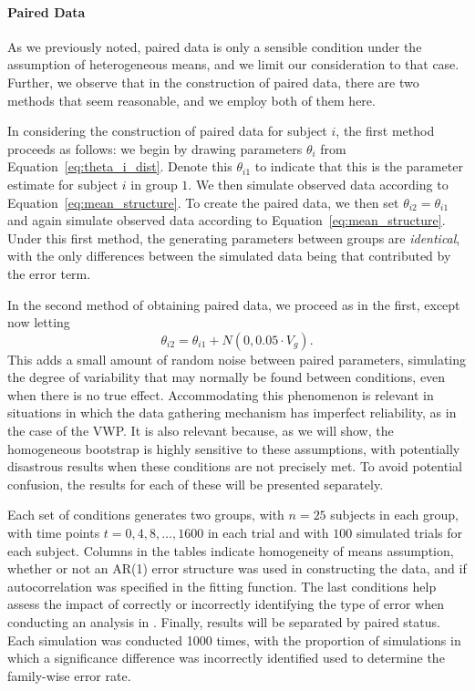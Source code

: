 \paragraph{Paired Data} As we previously noted, paired data is only a sensible condition under the assumption of heterogeneous means, and we limit our consideration to that case. Further, we observe that in the construction of paired data, there are two methods that seem reasonable, and we employ both of them here. 

In considering the construction of paired data for subject $i$, the first method proceeds as follows: we begin by drawing parameters $\theta_i$ from Equation~\ref{eq:theta_i_dist}. Denote this $\theta_{i1}$ to indicate that this is the parameter estimate for subject $i$ in group $1$. We then simulate observed data according to Equation~\ref{eq:mean_structure}. To create the paired data, we then set $\theta_{i2} = \theta_{i1}$ and again simulate observed data according to Equation~\ref{eq:mean_structure}. Under this first method, the generating parameters between groups are \textit{identical}, with the only differences between the simulated data being that contributed by the error term.

In the second method of obtaining paired data, we proceed as in the first, except now letting
\begin{equation}
\theta_{i2} = \theta_{i1} + N(0, 0.05 \cdot  V_g).
\end{equation}
This adds a small amount of random noise between paired parameters, simulating the degree of variability that may normally be found between conditions, even when there is no true effect. Accommodating this phenomenon is relevant in situations in which the data gathering mechanism has imperfect reliability, as in the case of the VWP. It is also relevant because, as we will show, the homogeneous bootstrap is highly sensitive to these assumptions, with potentially disastrous results when these conditions are not precisely met. To avoid potential confusion, the results for each of these will be presented separately.


Each set of conditions generates two groups, with $n = 25$ subjects in each group, with time points $t = 0, 4, 8, \dots, 1600$ in each trial and with $100$ simulated trials for each subject. Columns in the tables indicate homogeneity of means assumption, whether or not an AR(1) error structure was used in constructing the data, and if autocorrelation was specified in the fitting function. The last conditions help assess the impact of correctly or incorrectly identifying the type of error when conducting an analysis in . Finally, results will be separated by paired status. Each simulation was conducted 1000 times, with the proportion of simulations in which a significance difference was incorrectly identified used to determine the family-wise error rate. 


